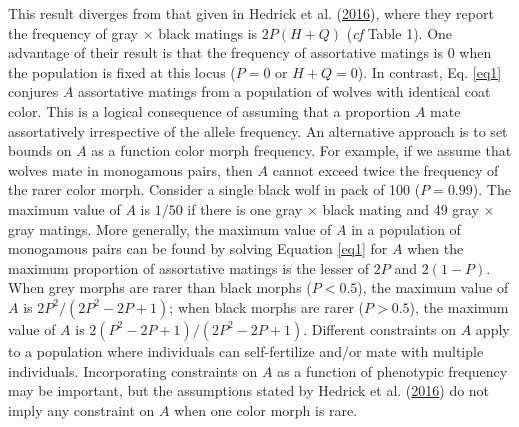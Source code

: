 \documentclass[
]{article}
\begin{document}
This result diverges from that given in Hedrick et al. (\protect\hyperlink{ref-hedrick_negative-assortative_2016}{2016}), where they report the frequency of gray \(\times\) black matings is \(2 P (H + Q)\) (\emph{cf} Table 1). One advantage of their result is that the frequency of assortative matings is 0 when the population is fixed at this locus (\(P = 0\) or \(H + Q = 0\)). In contrast, Eq. \ref{eq1} conjures \(A\) assortative matings from a population of wolves with identical coat color. This is a logical consequence of assuming that a proportion \(A\) mate assortatively irrespective of the allele frequency. An alternative approach is to set bounds on \(A\) as a function color morph frequency. For example, if we assume that wolves mate in monogamous pairs, then \(A\) cannot exceed twice the frequency of the rarer color morph. Consider a single black wolf in pack of 100 (\(P = 0.99\)). The maximum value of \(A\) is \(1/50\) if there is one gray \(\times\) black mating and 49 gray \(\times\) gray matings. More generally, the maximum value of \(A\) in a population of monogamous pairs can be found by solving Equation \ref{eq1} for \(A\) when the maximum proportion of assortative matings is the lesser of \(2P\) and \(2(1 - P)\). When grey morphs are rarer than black morphs (\(P < 0.5\)), the maximum value of \(A\) is \(2P ^ 2 / (2P ^ 2 - 2 P + 1)\); when black morphs are rarer (\(P > 0.5\)), the maximum value of \(A\) is \(2 (P^2 - 2P + 1) / (2 P ^ 2 - 2 P + 1)\). Different constraints on \(A\) apply to a population where individuals can self-fertilize and/or mate with multiple individuals. Incorporating constraints on \(A\) as a function of phenotypic frequency may be important, but the assumptions stated by Hedrick et al. (\protect\hyperlink{ref-hedrick_negative-assortative_2016}{2016}) do not imply any constraint on \(A\) when one color morph is rare.
\end{document}

